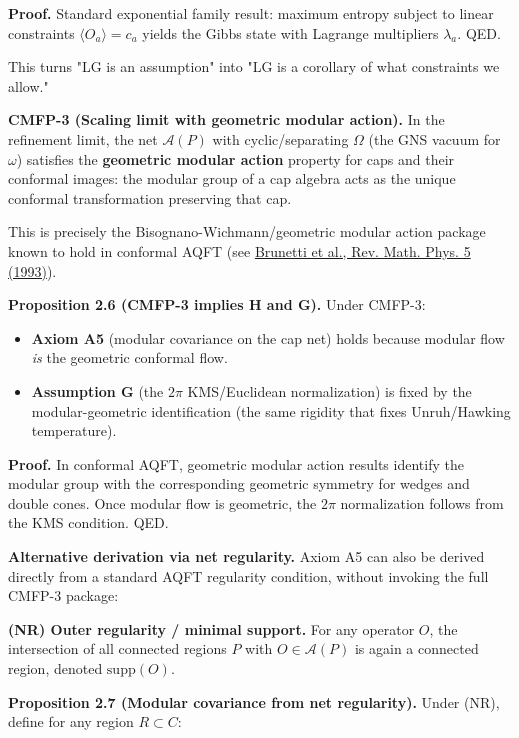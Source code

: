\textbf{Proof.} Standard exponential family result: maximum entropy subject to linear constraints \(\langle O_a \rangle = c_a\) yields the Gibbs state with Lagrange multipliers \(\lambda_a\). QED.

This turns "LG is an assumption" into "LG is a corollary of what constraints we allow."

\textbf{CMFP-3 (Scaling limit with geometric modular action).} In the refinement limit, the net \(\mathcal{A}(P)\) with cyclic/separating \(\Omega\) (the GNS vacuum for \(\omega\)) satisfies the \textbf{geometric modular action} property for caps and their conformal images: the modular group of a cap algebra acts as the unique conformal transformation preserving that cap.

This is precisely the Bisognano-Wichmann/geometric modular action package known to hold in conformal AQFT (see \href{https://arxiv.org/abs/funct-an/9302008}{Brunetti et al., Rev. Math. Phys. 5 (1993)}).

\textbf{Proposition 2.6 (CMFP-3 implies H and G).} Under CMFP-3:

\begin{itemize}
\tightlist
\item
  \textbf{Axiom A5} (modular covariance on the cap net) holds because modular flow \emph{is} the geometric conformal flow.
\item
  \textbf{Assumption G} (the \(2\pi\) KMS/Euclidean normalization) is fixed by the modular-geometric identification (the same rigidity that fixes Unruh/Hawking temperature).
\end{itemize}

\textbf{Proof.} In conformal AQFT, geometric modular action results identify the modular group with the corresponding geometric symmetry for wedges and double cones. Once modular flow is geometric, the \(2\pi\) normalization follows from the KMS condition. QED.

\textbf{Alternative derivation via net regularity.} Axiom A5 can also be derived directly from a standard AQFT regularity condition, without invoking the full CMFP-3 package:

\textbf{(NR) Outer regularity / minimal support.} For any operator \(O\), the intersection of all connected regions \(P\) with \(O \in \mathcal{A}(P)\) is again a connected region, denoted \(\mathrm{supp}(O)\).

\textbf{Proposition 2.7 (Modular covariance from net regularity).} Under (NR), define for any region \(R \subset C\):

